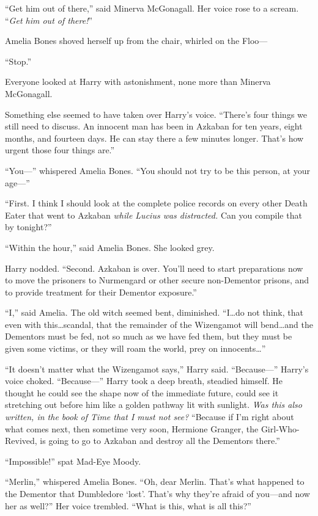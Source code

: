 “Get him out of there,” said Minerva McGonagall. Her voice rose to a scream. “\emph{Get him out of there!}”

Amelia Bones shoved herself up from the chair, whirled on the Floo—

“Stop.”

Everyone looked at Harry with astonishment, none more than Minerva McGonagall.

Something else seemed to have taken over Harry’s voice. “There’s four things we still need to discuss. An innocent man has been in Azkaban for ten years, eight months, and fourteen days. He can stay there a few minutes longer. That’s how urgent those four things are.”

“You—” whispered Amelia Bones. “You should not try to be this person, at your age—”

“First. I think I should look at the complete police records on every other Death Eater that went to Azkaban \emph{while Lucius was distracted.} Can you compile that by tonight?”

“Within the hour,” said Amelia Bones. She looked grey.

Harry nodded. “Second. Azkaban is over. You’ll need to start preparations now to move the prisoners to Nurmengard or other secure non-Dementor prisons, and to provide treatment for their Dementor exposure.”

“I,” said Amelia. The old witch seemed bent, diminished. “I…do not think, that even with this…scandal, that the remainder of the Wizengamot will bend…and the Dementors must be fed, not so much as we have fed them, but they must be given some victims, or they will roam the world, prey on innocents…”

“It doesn’t matter what the Wizengamot says,” Harry said. “Because—” Harry’s voice choked. “Because—” Harry took a deep breath, steadied himself. He thought he could see the shape now of the immediate future, could see it stretching out before him like a golden pathway lit with sunlight. \emph{Was this also written, in the book of Time that I must not see?} “Because if I’m right about what comes next, then sometime very soon, Hermione Granger, the Girl-Who-Revived, is going to go to Azkaban and destroy all the Dementors there.”

“Impossible!” spat Mad-Eye Moody.

“Merlin,” whispered Amelia Bones. “Oh, dear Merlin. That’s what happened to the Dementor that Dumbledore ‘lost’. That’s why they’re afraid of you—and now her as well?” Her voice trembled. “What is this, what is all this?”

